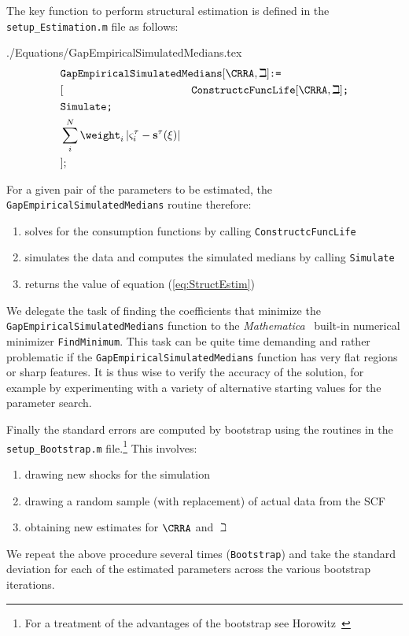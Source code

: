 \documentclass[titlepage, headings=optiontotocandhead]{\econtex}
\newcommand{\Mma}{\textit{Mathematica}}
\begin{document}
The key function to perform structural estimation is defined in the \texttt{setup\_Estimation.m} file as follows:
\begin{verbatimwrite}{./Equations/GapEmpiricalSimulatedMedians.tex}
  \begin{equation}\begin{gathered}\begin{aligned}
        \lefteqn{    \texttt{GapEmpiricalSimulatedMedians$[\CRRA,\beth]$:=}}    \nonumber \\
        &[&\texttt{ConstructcFuncLife$[\CRRA,\beth]$;}\nonumber\\
        &\texttt{Simulate;}\nonumber\\
        &\sum\limits_{i}^{N}\weight _{i}\left|\varsigma_{i}^{\tau }-\mathbf{s}^{\tau}(\xi )\right| \nonumber\\
        &];&\nonumber
      \end{aligned}\end{gathered}\end{equation}
\end{verbatimwrite}
\unskip
For a given pair of the parameters to be estimated, the \texttt{GapEmpiricalSimulatedMedians} routine therefore:
\begin{enumerate}
\item solves for the consumption functions by calling \texttt{ConstructcFuncLife}
\item simulates the data and computes the simulated medians by calling \texttt{Simulate}
\item returns the value of equation (\ref{eq:StructEstim})
\end{enumerate}

We delegate the task of finding the coefficients that minimize the
\texttt{GapEmpiricalSimulatedMedians} function to the \Mma~
built-in numerical minimizer \texttt{FindMinimum}.  This task can be
quite time demanding and rather problematic if the
\texttt{GapEmpiricalSimulatedMedians} function has very flat regions
or sharp features. It is thus wise to verify the accuracy of the
solution, for example by experimenting with a variety of alternative starting values for the
parameter search.

Finally the standard errors are computed by bootstrap using the
routines in the \texttt{setup\_Bootstrap.m} file.\footnote{For a
  treatment of the advantages of the bootstrap see
  Horowitz~\citeyearpar{horowitzBootstrap}} This involves:
\begin{enumerate}
\item drawing new shocks for the simulation
\item drawing a random sample (with replacement) of actual data from the SCF
\item obtaining new estimates for $\CRRA$ and ${\beth}$
\end{enumerate}
We repeat the above procedure several times (\texttt{Bootstrap}) and take the standard deviation for each of the estimated parameters across the various bootstrap iterations.
\end{document}
